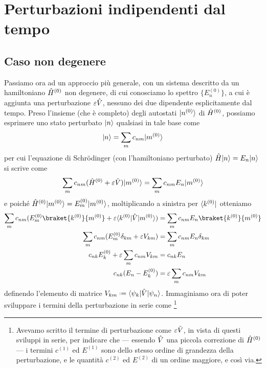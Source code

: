 \section{Perturbazioni indipendenti dal tempo}
\subsection{Caso non degenere}
Passiamo ora ad un approccio più generale, con un sistema descritto da un hamiltoniano $\hat{H}^{(0)}$ non degenere, di cui conosciamo lo spettro $\{E^{(0)}_n\}$, a cui è aggiunta una perturbazione $\varepsilon\hat{V}$, nessuno dei due dipendente esplicitamente dal tempo.
Preso l'insieme (che è completo) degli autostati $\lvert n^{(0)}\rangle$ di $\hat{H}^{(0)}$, possiamo esprimere uno stato perturbato $\lvert n\rangle$ qualsiasi in tale base come
\begin{equation}
	\lvert n\rangle=\sum_mc_{nm}\lvert m^{(0)}\rangle
	\label{eq:perturbazione-autostati-non-degeneri}
\end{equation}
per cui l'equazione di Schr\"odinger (con l'hamiltoniano perturbato) $\hat{H}\lvert n\rangle=E_n\lvert n\rangle$ si scrive come
\begin{equation}
	\sum_mc_{nm}(\hat{H}^{(0)}+\varepsilon\hat{V})\lvert m^{(0)}\rangle=\sum_mc_{nm}E_n\lvert m^{(0)}\rangle
\end{equation}
e poich\'e $\hat{H}^{(0)}\lvert m^{(0)}\rangle=E^{(0)}_m\lvert m^{(0)}\rangle$, moltiplicando a sinistra per $\langle k^{(0)}\rvert$ otteniamo
\begin{equation}
	\begin{aligned}
		\sum_mc_{nm}(E^{(0)}_m\braket{k^{(0)}}{m^{(0)}}+\epsilon\bra{k^{(0)}}\op V\ket{m^{(0)}})&=\sum_mc_{nm}E_n\braket{k^{(0)}}{m^{(0)}}\\
		\sum_mc_{nm}(E^{(0)}_m\delta_{km}+\epsilon V_{km})&=\sum_mc_{nm}E_n\delta_{km}\\
		c_{nk}E^{(0)}_k+\epsilon\sum_mc_{nm}V_{km}&=c_{nk}E_n\\
		c_{nk}(E_n-E^{(0)}_k)&=\epsilon\sum_mc_{nm}V_{km}
	\end{aligned}
	\label{eq:perturbazione-non-degenere}
\end{equation}
definendo l'elemento di matrice $V_{km}\defeq\bra{\psi_k}\op V\ket{\psi_n}$.
Immaginiamo ora di poter sviluppare i termini della perturbazione in serie come
\footnote{
	Avevamo scritto il termine di perturbazione come $\varepsilon\hat{V}$, in vista di questi sviluppi in serie, per indicare che --- essendo $\hat{V}$ una piccola correzione di $\hat{H}^{(0)}$ --- i termini $c^{(1)}$ ed $E^{(1)}$ sono dello stesso ordine di grandezza della perturbazione, e le quantità $c^{(2)}$ ed $E^{(2)}$ di un ordine maggiore, e cos\`i via.
}
